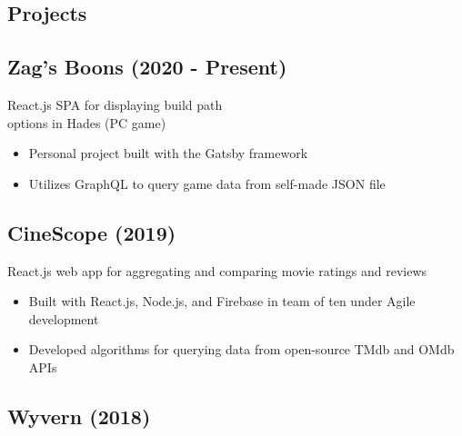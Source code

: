 \documentclass{article}
\begin{document}
\setlength{\columnsep}{1.5cm} 		%
\setlength{\columnseprule}{0.2pt} 	%
\begin{paracol}{2} 			%

\vspace{-2.5em}
\section{Projects}

\vspace{-0.5em}
\subsection{Zag's Boons (2020 - Present)} \hfill \vspace{0.2em}

{\color{NavyBlue} React.js SPA for displaying build path 
\\\indent options in Hades (PC game)}
\begin{itemize}[leftmargin=*]
	\itemsep0em 
	\item Personal project built with the Gatsby framework
	\item Utilizes GraphQL to query game data from self-made JSON file
\end{itemize}

\vspace{-0.5em}
\subsection{CineScope (2019)} \hfill \vspace{0.2em}

{\color{NavyBlue} React.js web app for aggregating and comparing 
\indent movie ratings and reviews}
\begin{itemize}[leftmargin=*]
	\itemsep0em 
	\item Built with React.js, Node.js, and Firebase in team of ten under Agile development
	\item Developed algorithms for querying data from open-source TMdb and OMdb APIs
\end{itemize}

\vspace{-0.5em}
\subsection{Wyvern (2018)} \hfill \vspace{0.2em}


\end{paracol}
\end{document}
